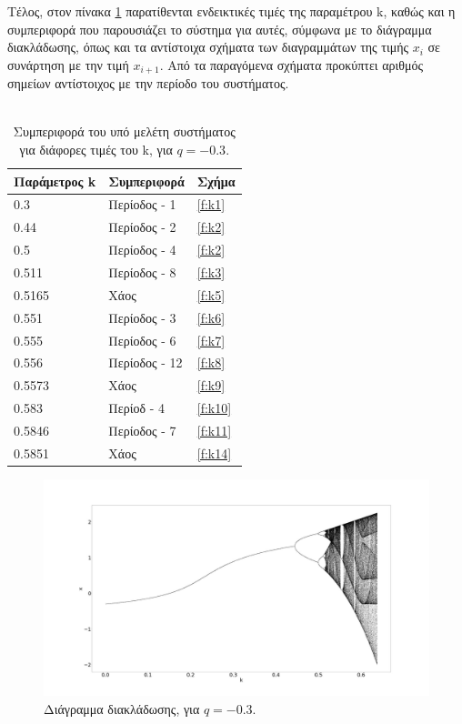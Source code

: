Τέλος, στον πίνακα \ref{tab:abc1} παρατίθενται ενδεικτικές τιμές της παραμέτρου k, καθώς και η συμπεριφορά που παρουσιάζει το σύστημα για αυτές, σύμφωνα με το διάγραμμα διακλάδωσης, όπως και τα αντίστοιχα σχήματα των διαγραμμάτων της τιμής \(x_i\) σε συνάρτηση με την τιμή \(x_{i+1}\). Από τα παραγόμενα σχήματα προκύπτει αριθμός σημείων αντίστοιχος με την περίοδο του συστήματος.\\\\

\begin{table}[ht]
	\centering
	\caption{ Συμπεριφορά του υπό μελέτη συστήματος για διάφορες τιμές του k, για $q=-0.3$.}
	\label{tab:abc1}
	\begin{tabular}{l | l | l}
		Παράμετρος k & Συμπεριφορά & Σχήμα\\
		\hline
		0.3 &  Περίοδος - 1 & \ref{f:k1}\\
		0.44& Περίοδος - 2 & \ref{f:k2}\\
		0.5& Περίοδος - 4 & \ref{f:k2}\\
		0.511 &  Περίοδος - 8 & \ref{f:k3}\\
		0.5165 & Χάος & \ref{f:k5}\\
		0.551 & Περίοδος - 3 & \ref{f:k6}\\
		0.555 & Περίοδος - 6 & \ref{f:k7}\\
		0.556 & Περίοδος - 12 & \ref{f:k8}\\
		0.5573 & Χάος & \ref{f:k9}\\
		0.583& Περίοδ - 4 & \ref{f:k10}\\
		0.5846 & Περίοδος - 7 & \ref{f:k11}\\
		0.5851 & Χάος & \ref{f:k14}\\
	\end{tabular}
	
\end{table}

\begin{figure}[ht]
	\centering
	\includegraphics[width=1\linewidth]{LateX images/graphs q03/g1}
	\caption{ Διάγραμμα διακλάδωσης, για $q=-0.3$.}
	\label{f:g8}
\end{figure}


